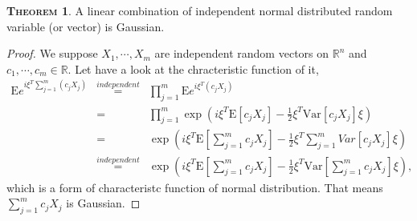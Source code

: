 \documentclass[a4paper, twoside, 11pt]{article}
\theoremstyle{definition}
\newtheorem{theorem}[definition]{\scshape Theorem}
\newtheorem{corollary}[definition]{\scshape Corollary}
\newcommand{\brkt}[1]{\left({#1} \right)}
\begin{document}

  


\begin{theorem}
  A linear combination of independent normal distributed random variable (or vector) is Gaussian.
\end{theorem}

\begin{proof}
  We suppose $X_1, \cdots, X_m$ are independent random vectors  on $\mathbb{R}^n$ and $c_1, \cdots, c_m \in \mathbb{R}$. Let have a look at the chracteristic function of it,
  \begin{eqnarray*}
	\mathrm{E}e^{i\xi^T\sum_{j=1}^m(c_jX_j)} &\overset{independent}{=}&\prod_{j=1}^{m} \mathrm{E}e^{i\xi^T(c_jX_j)}\\
	&=& \prod_{j=1}^m \exp\brkt{i\xi^T\mathrm{E}[c_jX_j]-\frac{1}{2}\xi^T\mathrm{Var}[c_jX_j]\xi}\\
	&=&  \exp\brkt{i\xi^T\mathrm{E}[\sum_{j=1}^{m}c_jX_j]-\frac{1}{2}\xi^T\mathrm\sum_{j=1}^{m}{Var}[c_jX_j]\xi}\\
	&\overset{independent}{=}&  \exp\brkt{i\xi^T\mathrm{E}[\sum_{j=1}^{m}c_jX_j]-\frac{1}{2}\xi^T\mathrm{Var}[\sum_{j=1}^{m}c_jX_j]\xi},
  \end{eqnarray*}
  which is a form of characteristc function of normal distribution. That means $\sum_{j=1}^m c_jX_j$ is Gaussian. 
\end{proof}
\end{document}
